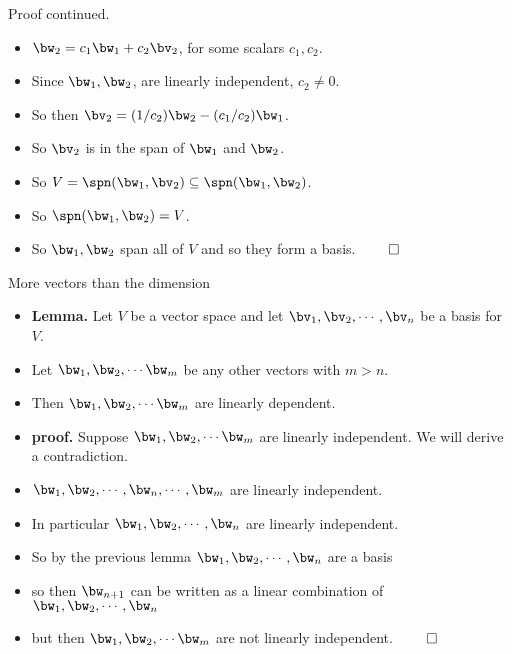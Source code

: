 \documentclass{beamer}
\begin{document}
\begin{frame}{Proof continued.}

\begin{itemize}
\item $\bw_2 = c_1\bw_1 + c_2\bv_2$, for some scalars $c_1, c_2$.
\item Since $\bw_1, \bw_2$, are linearly independent, $c_2 \not= 0$.
\item So then $\bv_2 = (1/c_2)\bw_2 - (c_1/c_2)\bw_1$.
\item So $\bv_2$ is in the span of $\bw_1$ and $\bw_2$.
\item So $V=\spn(\bw_1,\bv_2)\subseteq\spn(\bw_1,\bw_2)$.
\item So $\spn(\bw_1,\bw_2) = V$.
\item So $\bw_1,\bw_2$ span all of $V$ and so they form a basis. $\qed$
\end{itemize}

\end{frame}
\begin{frame}{More vectors than the dimension}

\begin{itemize}
\item \textbf{Lemma.} Let $V$ be a vector space and let $\bv_1,\bv_2,\cdots,\bv_n$ be a basis for $V$.
\item Let $\bw_1,\bw_2,\cdots\bw_m$ be any other vectors with $m > n$.
\item Then $\bw_1,\bw_2,\cdots\bw_m$ are linearly dependent.
\item \textbf{proof.} Suppose $\bw_1,\bw_2,\cdots\bw_m$ are linearly independent. We will derive a contradiction.
\item $\bw_1,\bw_2,\cdots,\bw_n,\cdots,\bw_m$ are linearly independent.
\item In particular $\bw_1,\bw_2,\cdots,\bw_n$ are linearly independent.
\item So by the previous lemma $\bw_1,\bw_2,\cdots,\bw_n$ are a basis
\item so then $\bw_{n+1}$ can be written as a linear combination of $\bw_1,\bw_2,\cdots,\bw_n$
\item but then $\bw_1,\bw_2,\cdots\bw_m$ are not linearly independent. $\qed$
\end{itemize}

\end{frame}
\end{document}
